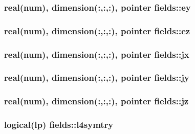 \subsubsection[{\texorpdfstring{ey}{ey}}]{\setlength{\rightskip}{0pt plus 5cm}real(num), dimension(\+:,\+:,\+:), pointer fields\+::ey}\hypertarget{namespacefields_a416c4dba2dc5fb0ac7cbeb6bdbaffc2c}{}\label{namespacefields_a416c4dba2dc5fb0ac7cbeb6bdbaffc2c}
\subsubsection[{\texorpdfstring{ez}{ez}}]{\setlength{\rightskip}{0pt plus 5cm}real(num), dimension(\+:,\+:,\+:), pointer fields\+::ez}\hypertarget{namespacefields_a0fa6f30ad153ef0e52f181d70e3b92e1}{}\label{namespacefields_a0fa6f30ad153ef0e52f181d70e3b92e1}
\subsubsection[{\texorpdfstring{jx}{jx}}]{\setlength{\rightskip}{0pt plus 5cm}real(num), dimension(\+:,\+:,\+:), pointer fields\+::jx}\hypertarget{namespacefields_ab4aadb2986a77b2c2546cee63c380fca}{}\label{namespacefields_ab4aadb2986a77b2c2546cee63c380fca}
\subsubsection[{\texorpdfstring{jy}{jy}}]{\setlength{\rightskip}{0pt plus 5cm}real(num), dimension(\+:,\+:,\+:), pointer fields\+::jy}\hypertarget{namespacefields_aacf6032b8f949c35388351665b007c93}{}\label{namespacefields_aacf6032b8f949c35388351665b007c93}
\subsubsection[{\texorpdfstring{jz}{jz}}]{\setlength{\rightskip}{0pt plus 5cm}real(num), dimension(\+:,\+:,\+:), pointer fields\+::jz}\hypertarget{namespacefields_ad1f49be91f74095a76edaa8ff8c26c8c}{}\label{namespacefields_ad1f49be91f74095a76edaa8ff8c26c8c}
\subsubsection[{\texorpdfstring{l4symtry}{l4symtry}}]{\setlength{\rightskip}{0pt plus 5cm}logical(lp) fields\+::l4symtry}\hypertarget{namespacefields_a12122e98c83fda712ad6b5acfc9d8e0d}{}\label{namespacefields_a12122e98c83fda712ad6b5acfc9d8e0d}
